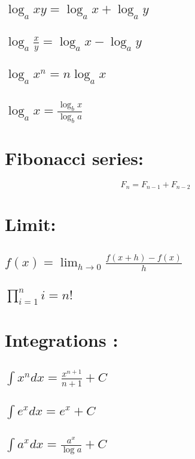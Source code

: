 \documentclass[27pt]{article}
\begin{document}
  \subsection{$\displaystyle \log_axy = \log_ax + \log_ay  $}
  \subsection{$\displaystyle \log_a \frac{x}{y} = \log_ax - \log_ay  $}
  \subsection{$\displaystyle \log_ax^n = n\log_ax  $}
  \subsection{$\displaystyle \log_ax = \frac{\log_bx }{\log_ba}  $}
  
\section{Fibonacci series:}  $$ F_n=F_{n-1}+F_{n-2} $$    

\section{Limit:}   
 \subsection{$ f(x)=\lim_{h\to 0}\frac{f(x+h)-f(x)}{h}  $}
 \subsection{$\prod_{i=1}^ni=n! $} 
 
\section{Integrations :}
 \subsection{$ \int x^ndx ={ \frac{x^{n+1}}{n+1}} + C $}
 \subsection{$ \int e^xdx = e^x + C $}   
 \subsection{$ \int a^xdx ={ \frac{a^x}{\log a}} + C $} 
\end{document}
